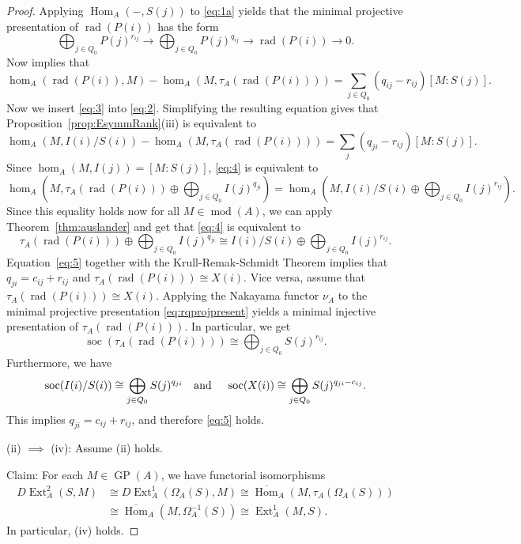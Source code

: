\documentclass[12pt,reqno]{amsart}
\theoremstyle{definition}
\newcommand{\md}{\operatorname{mod}}
\newcommand{\soc}{\operatorname{soc}}
\newcommand{\rad}{\operatorname{rad}}
\newcommand{\GP}{\operatorname{GP}}
\newcommand{\Hom}{\operatorname{Hom}}
\newcommand{\Ext}{\operatorname{Ext}}
\begin{document}
\begin{proof}
Applying $\Hom_A(-,S(j))$ to \eqref{eq:1a} yields that 
the minimal projective presentation of $\rad(P(i))$ has the form
\begin{equation}\label{eq:rqprojpresent}
\bigoplus_{j \in Q_0} P(j)^{r_{ij}} \to 
\bigoplus_{j \in Q_0} P(j)^{q_{ij}} \to \rad(P(i)) \to 0.
\end{equation}
Now \cite[Lemma~2.7]{BS25} implies that
\begin{equation}\label{eq:3}
\hom_A(\rad(P(i)),M) - \hom_A(M,\tau_A(\rad(P(i)))) = 
\sum_{j \in Q_0} (q_{ij} - r_{ij}) [M:S(j)].
\end{equation}
Now we insert \eqref{eq:3} into \eqref{eq:2}.
Simplifying the resulting equation gives that 
Proposition~\ref{prop:EsymmRank}(iii) is equivalent to
\begin{equation}\label{eq:4}
\hom_A(M,I(i)/S(i)) - \hom_A(M,\tau_A(\rad(P(i)))) = 
\sum_j(q_{ji}-r_{ij}) [M:S(j)].
\end{equation}
Since $\hom_A(M,I(j)) = [M:S(j)]$, \eqref{eq:4} is equivalent 
to
$$
\hom_A\left(M,\tau_A(\rad(P(i))) \oplus \bigoplus_{j \in Q_0} 
I(j)^{q_{ji}}\right) =
\hom_A\left(M, I(i)/S(i) \oplus\bigoplus_{j \in Q_0} I(j)^{r_{ij}}\right).
$$
Since this equality holds now for all $M \in \md(A)$, we
can apply 
Theorem~\ref{thm:auslander} and get that \eqref{eq:4} is equivalent to
\begin{equation}\label{eq:5}
 \tau_A(\rad(P(i))) \oplus \bigoplus_{j \in Q_0} I(j)^{q_{ji}}
       \cong I(i)/S(i) \oplus\bigoplus_{j \in Q_0} I(j)^{r_{ij}}.
\end{equation}
Equation~\eqref{eq:5} together with the Krull-Remak-Schmidt Theorem implies that $q_{ji} = c_{ij}+r_{ij}$ and $\tau_A(\rad(P(i))) \cong X(i)$.
Vice versa, assume that $\tau_A(\rad(P(i))) \cong X(i)$.
Applying the Nakayama functor $\nu_A$ to the 
minimal projective presentation \eqref{eq:rqprojpresent} yields a minimal
injective presentation of $\tau_A(\rad(P(i)))$.
In particular, we get
$$
\soc(\tau_A(\rad(P(i)))) \cong \bigoplus_{j \in Q_0} S(j)^{r_{ij}}.
$$
Furthermore, we have
$$
\soc(I(i)/S(i)) \cong \bigoplus_{j \in Q_0} S(j)^{q_{ji}}
\text{\quad and \quad}
\soc(X(i)) \cong \bigoplus_{j \in Q_0} S(j)^{q_{ji}-c_{ij}}.
$$
This implies
$q_{ji} = c_{ij}+r_{ij}$, and therefore \eqref{eq:5} holds.

(ii) $\implies$ (iv):
Assume (ii) holds.

Claim:
For each $M \in \GP(A)$, we have 
functorial isomorphisms
\begin{align*}
D\!\Ext_A^2(S,M) 
&\cong D\!\Ext_A^1(\Omega_A(S),M)
\cong \overline{\Hom}_A(M,\tau_A(\Omega_A(S)))
\\
&\cong \overline{\Hom}_A(M,\Omega_A^{-1}(S)) 
\cong \Ext_A^1(M,S).
\end{align*}
In particular, (iv) holds.


\end{proof}
\end{document}
